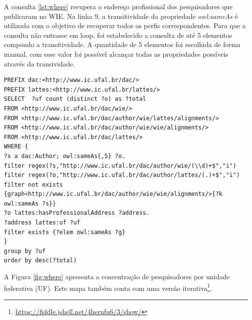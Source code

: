 A consulta \ref{lst:where} recupera o endereço profissional dos pesquisadores que publicaram no WIE. Na linha 9, a transitividade da propriedade \textit{owl:sameAs} é utilizada com o objetivo de recuperar todos os perfis correspondentes. Para que a consulta não entrasse em loop, foi estabelecido a consulta de até 5 elementos compondo a transitividade. A quantidade de 5 elementos foi escolhida de forma manual, com esse valor foi possível alcançar todas as propriedades possíveis através da transividade.
% 
% 
%
%

\begin{lstlisting}[captionpos=b, caption= Consulta para recuperar a concentração de pesquisadores por UF, label=lst:where,
basicstyle=\ttfamily,frame=single]
PREFIX dac:<http://www.ic.ufal.br/dac/>
PREFIX lattes:<http://www.ic.ufal.br/lattes/>
SELECT  ?uf count (distinct ?o) as ?total
FROM <http://www.ic.ufal.br/dac/wie/>
FROM <http://www.ic.ufal.br/dac/author/wie/lattes/alignments/>
FROM <http://www.ic.ufal.br/dac/author/wie/wie/alignments/>
FROM <http://www.ic.ufal.br/dac/lattes/>
WHERE {
?s a dac:Author; owl:sameAs{,5} ?o.
filter regex(?s,"http://www.ic.ufal.br/dac/author/wie/(\\d)+$","i")
filter regex(?o,"http://www.ic.ufal.br/dac/author/lattes/(.)+$","i")
filter not exists {graph<http://www.ic.ufal.br/dac/author/wie/wie/alignments/>{?k owl:sameAs ?s}}
?o lattes:hasProfessionalAddress ?address.
?address lattes:uf ?uf
filter exists {?elem owl:sameAs ?g}
}
group by ?uf
order by desc(?total)

\end{lstlisting}

A Figura \ref{fig:where} apresenta a concentração de pesquisadores por unidade federativa (UF). Este mapa também conta com uma versão iterativa\footnote{\url{https://fiddle.jshell.net/4hernfu6/3/show/}}.

